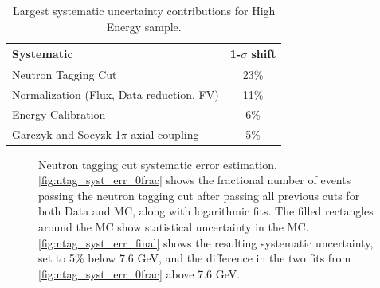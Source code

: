 \begin{table}[h]
\begin{tabular}{lc}
\hline \hline
Systematic& 1-$\sigma$ shift \\
\hline
Neutron Tagging Cut & 23\%\\
Normalization (Flux, Data reduction, FV) & 11\% \\
Energy Calibration & 6\% \\
Garczyk and Socyzk 1$\pi$ axial coupling & 5\% \\
\hline
\end{tabular}
\caption{Largest systematic uncertainty contributions for High Energy sample.}
\label{tab:systematics}
\end{table}     


\begin{figure}
	\centering
	\caption{Neutron tagging cut systematic error estimation.  \ref{fig:ntag_syst_err_0frac} shows the fractional number of events passing the neutron tagging cut after passing all previous cuts for both Data and MC, along with logarithmic fits. The filled rectangles around the MC show statistical uncertainty in the MC. \ref{fig:ntag_syst_err_final} shows the resulting systematic uncertainty, set to 5\% below 7.6 GeV, and the difference in the two fits from \ref{fig:ntag_syst_err_0frac} above 7.6 GeV.}
\label{fig:ntag_syst}
\end{figure}


